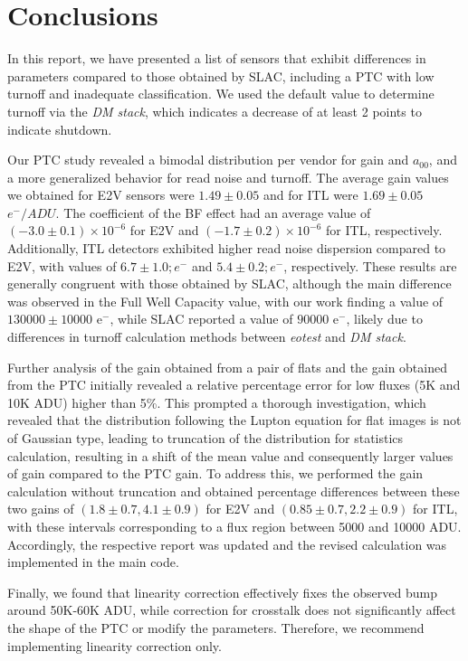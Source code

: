 \section{Conclusions} \label{sec:conclusions}
In this report, we have presented a list of sensors that exhibit differences in parameters compared to those obtained by SLAC, including a PTC with low turnoff and inadequate classification. We used the default value to determine turnoff via the \textit{DM stack}, which indicates a decrease of at least 2 points to indicate shutdown.

\vspace{3mm}
Our PTC study revealed a bimodal distribution per vendor for gain and $a_{00}$, and a more generalized behavior for read noise and turnoff. The average gain values we obtained for E2V sensors were $1.49 \pm 0.05$ and for ITL were $1.69 \pm 0.05$ $e^{-}/ADU$. The coefficient of the BF effect had an average value of $(-3.0 \pm 0.1)\times 10 ^{-6}$ for E2V and $(-1.7 \pm 0.2)\times 10 ^{-6}$ for ITL, respectively. Additionally, ITL detectors exhibited higher read noise dispersion compared to E2V, with values of $6.7 \pm 1.0 ; e^{-}$ and $5.4 \pm 0.2 ; e^{-}$, respectively. These results are generally congruent with those obtained by SLAC, although the main difference was observed in the Full Well Capacity value, with our work finding a value of $130000 \pm 10000$ e$^-$, while SLAC reported a value of $90000$ e$^-$, likely due to differences in turnoff calculation methods between \textit{eotest} and \textit{DM stack}.


\vspace{3mm}
Further analysis of the gain obtained from a pair of flats and the gain obtained from the PTC initially revealed a relative percentage error for low fluxes (5K and 10K ADU) higher than 5\%. This prompted a thorough investigation, which revealed that the distribution following the Lupton equation for flat images is not of Gaussian type, leading to truncation of the distribution for statistics calculation, resulting in a shift of the mean value and consequently larger values of gain compared to the PTC gain. To address this, we performed the gain calculation without truncation and obtained percentage differences between these two gains of $(1.8 \pm 0.7, 4.1 \pm 0.9)$ for E2V and $(0.85 \pm 0.7, 2.2 \pm 0.9)$ for ITL, with these intervals corresponding to a flux region between 5000 and 10000 ADU. Accordingly, the respective report was updated and the revised calculation was implemented in the main code.


\vspace{3mm}
Finally, we found that linearity correction effectively fixes the observed bump around 50K-60K ADU, while correction for crosstalk does not significantly affect the shape of the PTC or modify the parameters. Therefore, we recommend implementing linearity correction only.